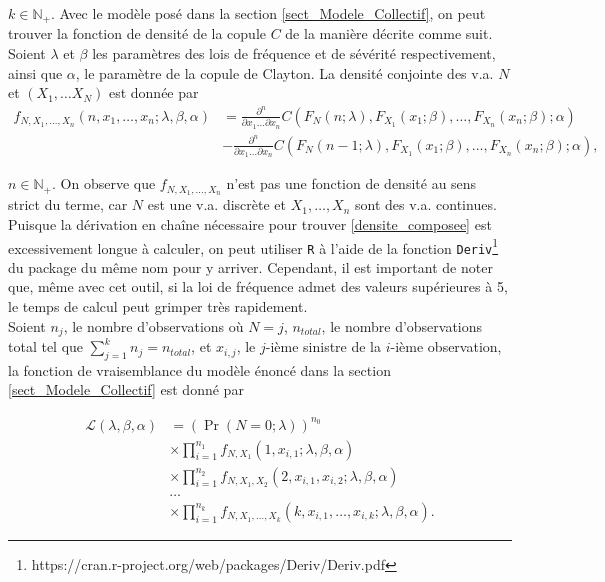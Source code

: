\documentclass{article}
\begin{document}
		$k \in \mathbb{N_+}$. Avec le modèle posé dans la section \ref{sect_Modele_Collectif}, on peut trouver la fonction de densité de la copule $C$ de la manière décrite comme suit.\\
	
		Soient $\lambda$ et $\beta$ les paramètres des lois de fréquence et de sévérité respectivement, ainsi que $\alpha$, le paramètre de la copule de Clayton. La densité conjointe des v.a. $N$ et $(X_1, \dots X_N)$ est donnée par
		\begin{align}
		f_{N, X_1, \dots, X_n}(n, x_1, \dots, x_n; \lambda, \beta, \alpha) 
		&= \frac{\partial^n}{\partial x_1 \dots \partial x_n} C(F_N(n;\lambda),F_{X_1}(x_1; \beta),\dots,F_{X_n}(x_n;\beta);\alpha)  \nonumber \\
		&   - \frac{\partial^n}{\partial x_1 \dots \partial x_n} C(F_N(n-1;\lambda),F_{X_1}(x_1;\beta),\dots,F_{X_n}(x_n;\beta);\alpha), \label{densite_composee}
		\end{align}
		
		$n \in \mathbb{N_+}$. On observe que $f_{N, X_1, \dots, X_n}$ n'est pas une fonction de densité au sens strict du terme, car $N$ est une v.a. discrète et $X_1, \dots, X_n$ sont des v.a. continues. \\
		
		Puisque la dérivation en chaîne nécessaire pour trouver \eqref{densite_composee} est excessivement longue à calculer, on peut utiliser \texttt{R} à l'aide de la fonction \texttt{Deriv}\footnote{https://cran.r-project.org/web/packages/Deriv/Deriv.pdf} du package du même nom pour y arriver. Cependant, il est important de noter que, même avec cet outil, si la loi de fréquence admet des valeurs supérieures à 5, le temps de calcul peut grimper très rapidement.\\
		
		Soient $n_j$, le nombre d'observations où $N = j$, $n_{total}$, le nombre d'observations total tel que $\sum_{j=1}^{k} n_j = n_{total}$, et $x_{i,j}$, le $j$-ième sinistre de la $i$-ième observation, la fonction de vraisemblance du modèle énoncé dans la section \ref{sect_Modele_Collectif} est donné par
		
		\begin{align*}
		 \mathcal{L}(\lambda, \beta, \alpha) 
		 &= \left( \Pr (N=0 ; \lambda)\right)^{n_0} \\
		 & \times \prod_{i = 1}^{n_1} f_{N,X_1}(1,x_{i,1};\lambda,\beta, \alpha)\\
		 & \times \prod_{i = 1}^{n_2} f_{N,X_1,X_2}(2,x_{i,1},x_{i,2};\lambda,\beta, \alpha)\\
		 & \dots\\
		 & \times \prod_{i = 1}^{n_k} f_{N,X_1,\dots,X_k}(k,x_{i,1},\dots,x_{i,k};\lambda,\beta, \alpha).
		\end{align*}
		 
\end{document}
